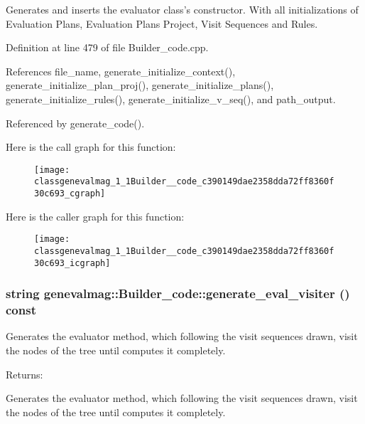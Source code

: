 Generates and inserts the evaluator class's constructor. With all initializations of Evaluation Plans, Evaluation Plans Project, Visit Sequences and Rules. 

Definition at line 479 of file Builder\_\-code.cpp.

References file\_\-name, generate\_\-initialize\_\-context(), generate\_\-initialize\_\-plan\_\-proj(), generate\_\-initialize\_\-plans(), generate\_\-initialize\_\-rules(), generate\_\-initialize\_\-v\_\-seq(), and path\_\-output.

Referenced by generate\_\-code().

Here is the call graph for this function:\nopagebreak
\begin{figure}[H]
\begin{center}
\leavevmode
\texttt{[image: classgenevalmag\_1\_1Builder\_\_code\_c390149dae2358dda72ff8360f30c693\_cgraph]}
\end{center}
\end{figure}


Here is the caller graph for this function:\nopagebreak
\begin{figure}[H]
\begin{center}
\leavevmode
\texttt{[image: classgenevalmag\_1\_1Builder\_\_code\_c390149dae2358dda72ff8360f30c693\_icgraph]}
\end{center}
\end{figure}
\hypertarget{classgenevalmag_1_1Builder__code_d40103cc1f4217fdba2924ed1e29efdc}{
\subsubsection[{generate\_\-eval\_\-visiter}]{\setlength{\rightskip}{0pt plus 5cm}string genevalmag::Builder\_\-code::generate\_\-eval\_\-visiter () const}}
\label{classgenevalmag_1_1Builder__code_d40103cc1f4217fdba2924ed1e29efdc}


Generates the evaluator method, which following the visit sequences drawn, visit the nodes of the tree until computes it completely. \begin{Desc}
\item[Returns:]\end{Desc}
Generates the evaluator method, which following the visit sequences drawn, visit the nodes of the tree until computes it completely. 

